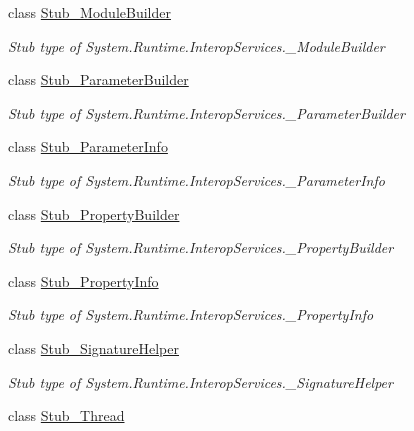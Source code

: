 \begin{DoxyCompactItemize}
class \hyperlink{class_system_1_1_runtime_1_1_interop_services_1_1_fakes_1_1_stub___module_builder}{Stub\-\_\-\-Module\-Builder}
\begin{DoxyCompactList}\small\item\em Stub type of System.\-Runtime.\-Interop\-Services.\-\_\-\-Module\-Builder\end{DoxyCompactList}\item 
class \hyperlink{class_system_1_1_runtime_1_1_interop_services_1_1_fakes_1_1_stub___parameter_builder}{Stub\-\_\-\-Parameter\-Builder}
\begin{DoxyCompactList}\small\item\em Stub type of System.\-Runtime.\-Interop\-Services.\-\_\-\-Parameter\-Builder\end{DoxyCompactList}\item 
class \hyperlink{class_system_1_1_runtime_1_1_interop_services_1_1_fakes_1_1_stub___parameter_info}{Stub\-\_\-\-Parameter\-Info}
\begin{DoxyCompactList}\small\item\em Stub type of System.\-Runtime.\-Interop\-Services.\-\_\-\-Parameter\-Info\end{DoxyCompactList}\item 
class \hyperlink{class_system_1_1_runtime_1_1_interop_services_1_1_fakes_1_1_stub___property_builder}{Stub\-\_\-\-Property\-Builder}
\begin{DoxyCompactList}\small\item\em Stub type of System.\-Runtime.\-Interop\-Services.\-\_\-\-Property\-Builder\end{DoxyCompactList}\item 
class \hyperlink{class_system_1_1_runtime_1_1_interop_services_1_1_fakes_1_1_stub___property_info}{Stub\-\_\-\-Property\-Info}
\begin{DoxyCompactList}\small\item\em Stub type of System.\-Runtime.\-Interop\-Services.\-\_\-\-Property\-Info\end{DoxyCompactList}\item 
class \hyperlink{class_system_1_1_runtime_1_1_interop_services_1_1_fakes_1_1_stub___signature_helper}{Stub\-\_\-\-Signature\-Helper}
\begin{DoxyCompactList}\small\item\em Stub type of System.\-Runtime.\-Interop\-Services.\-\_\-\-Signature\-Helper\end{DoxyCompactList}\item 
class \hyperlink{class_system_1_1_runtime_1_1_interop_services_1_1_fakes_1_1_stub___thread}{Stub\-\_\-\-Thread}

\end{DoxyCompactItemize}
